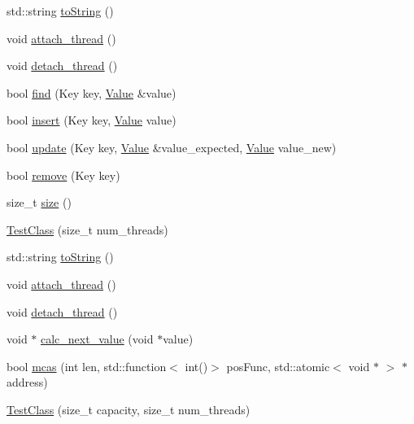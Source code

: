 \begin{DoxyCompactItemize}
\item 
std\+::string \hyperlink{class_test_class_a84e73a91ede625887472a307235d6de5}{to\+String} ()
\item 
void \hyperlink{class_test_class_a7e6bce4c39c047282ea8c1f1485a260b}{attach\+\_\+thread} ()
\item 
void \hyperlink{class_test_class_a79b3a395c8a1fac7a156228a27d829cc}{detach\+\_\+thread} ()
\item 
bool \hyperlink{class_test_class_af497b95115e81f882851b2ab843c298c}{find} (Key key, \hyperlink{hash__map_2test_object_8h_ad777bf08d8e2b01df17ba5e3c51ae11f}{Value} \&value)
\item 
bool \hyperlink{class_test_class_a0d075565ad4cccdb071bf267fe444681}{insert} (Key key, \hyperlink{hash__map_2test_object_8h_ad777bf08d8e2b01df17ba5e3c51ae11f}{Value} value)
\item 
bool \hyperlink{class_test_class_a4c33c8cac20119f9bee9b5091bc8a385}{update} (Key key, \hyperlink{hash__map_2test_object_8h_ad777bf08d8e2b01df17ba5e3c51ae11f}{Value} \&value\+\_\+expected, \hyperlink{hash__map_2test_object_8h_ad777bf08d8e2b01df17ba5e3c51ae11f}{Value} value\+\_\+new)
\item 
bool \hyperlink{class_test_class_a3a22d60709c15d419f69d29b7de92d02}{remove} (Key key)
\item 
size\+\_\+t \hyperlink{class_test_class_af2230f298ab3ef4ebf71aa7afa3fb6ca}{size} ()
\item 
\hyperlink{class_test_class_a25153d9821ce372f9c9146891b04aa07}{Test\+Class} (size\+\_\+t num\+\_\+threads)
\item 
std\+::string \hyperlink{class_test_class_a84e73a91ede625887472a307235d6de5}{to\+String} ()
\item 
void \hyperlink{class_test_class_a7e6bce4c39c047282ea8c1f1485a260b}{attach\+\_\+thread} ()
\item 
void \hyperlink{class_test_class_a79b3a395c8a1fac7a156228a27d829cc}{detach\+\_\+thread} ()
\item 
void $\ast$ \hyperlink{class_test_class_a34905bce461fd703bbfb598a1a4f2ff1}{calc\+\_\+next\+\_\+value} (void $\ast$value)
\item 
bool \hyperlink{class_test_class_a28aaf697b939932f750c2607fe5ec1ce}{mcas} (int len, std\+::function$<$ int()$>$ pos\+Func, std\+::atomic$<$ void $\ast$ $>$ $\ast$address)
\item 
\hyperlink{class_test_class_a2caeb43f7bbe5512fac0d4c58f1c2263}{Test\+Class} (size\+\_\+t capacity, size\+\_\+t num\+\_\+threads)
\item 

\end{DoxyCompactItemize}

